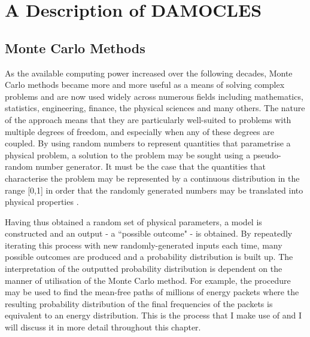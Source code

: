   \chapter{A Description of DAMOCLES}\label{chp:chp2}

%
%


\section{Monte Carlo Methods}


As the available computing power increased over the following decades, Monte Carlo methods became more and more useful as a means of solving complex problems and are now used widely across numerous fields including mathematics, statistics, engineering, finance, the physical sciences and many others.  The nature of the approach means that they are particularly well-suited to problems with multiple degrees of freedom, and especially when any of these degrees are coupled.  By using random numbers to represent quantities that parametrise a physical problem, a solution to the problem may be sought using a pseudo-random number generator.   It must be the case that the quantities that characterise the problem may be represented by a continuous distribution in the range [0,1] in order that the randomly generated numbers may be translated into physical properties \citep{Shreider1966}.  

Having thus obtained a random set of physical parameters, a model is constructed and an output - a ``possible outcome" - is obtained.  By repeatedly iterating this process with new randomly-generated inputs each time, many possible outcomes are produced and a probability distribution is built up.  The interpretation of the outputted probability distribution is dependent on the manner of utilisation of the Monte Carlo method.  For example, the procedure may be used to find the mean-free paths of millions of energy packets where the resulting probability distribution of the final frequencies of the packets is equivalent to an energy distribution.  This is the process that I make use of and I will discuss it in more detail throughout this chapter.

